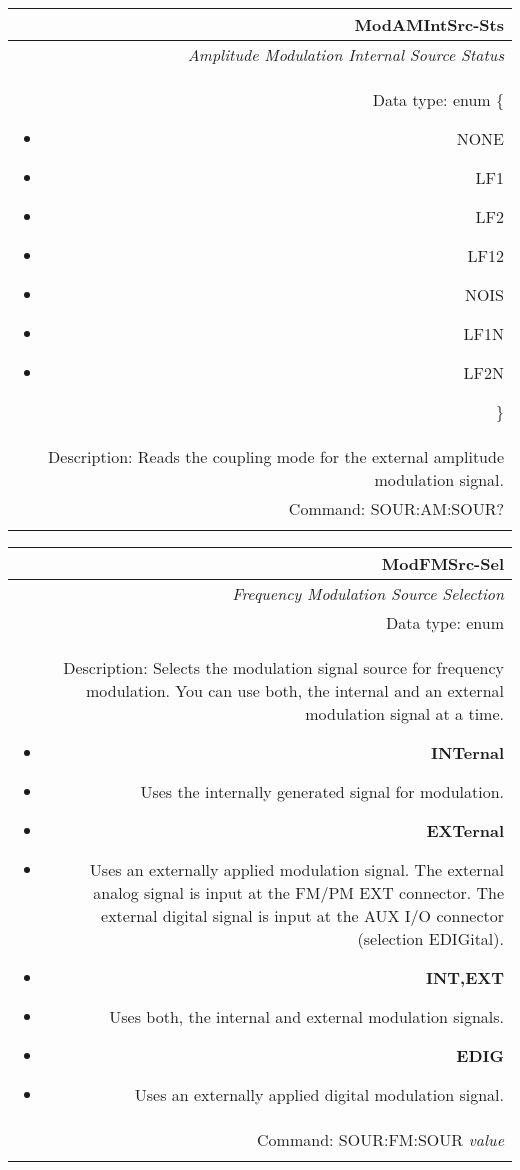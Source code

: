 \documentclass[openany]{article}
\begin{document}
		\begin{tabular}{N}
			\hline
			\bfseries ModAMIntSrc-Sts \\ \hline
			\emph{Amplitude Modulation Internal Source Status} \\
			Data type: enum \{\begin{itemize}[noitemsep]
				\small
				\item[] NONE
				\item[] LF1
				\item[] LF2
				\item[] LF12
				\item[] NOIS
				\item[] LF1N
				\item[] LF2N
			\end{itemize}\} \\ 
			Description: Reads the coupling mode for the external amplitude modulation signal. \\
			Command: SOUR:AM:SOUR? \\
			\\

		\end{tabular}
%

		\begin{tabular}{N}
			\hline
			\bfseries ModFMSrc-Sel \\ \hline
			\emph{Frequency Modulation Source Selection} \\
			Data type: enum \\  
			Description: Selects the modulation signal source for frequency modulation. You can use both, the internal and an external modulation signal at a time.\begin{itemize}[noitemsep]
				\small
				\item[] \textbf{INTernal}
				\item[] Uses the internally generated signal for modulation.
				\item[] \textbf{EXTernal}
				\item[]	Uses an externally applied modulation signal. The external analog signal is input at the FM/PM EXT connector. The external digital signal is input at the AUX I/O connector (selection EDIGital).
				\item[] \textbf{INT,EXT} 
				\item[]	Uses both, the internal and external modulation signals.
				\item[] \textbf{EDIG} 
				\item[]	Uses an externally applied digital modulation signal.
			\end{itemize} \\
			Command: SOUR:FM:SOUR \emph{value} \\
			\\

		\end{tabular}
\end{document}
